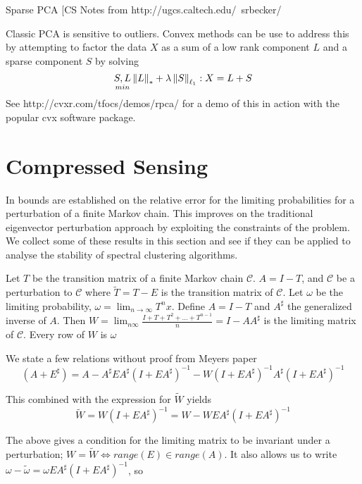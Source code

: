 Sparse PCA
[CS Notes from http://ugcs.caltech.edu/~srbecker/

Classic PCA is sensitive to outliers.  Convex methods can be use to address this by attempting to factor the data $X$ as a sum of a low rank component $L$ and a sparse component $S$ by solving
\begin{equation*}
\underset{min}{S,L} \left\Vert L\right\Vert_* + \lambda \left\Vert S\right\Vert_{\ell_1}  : X=L+S
\end{equation*}
See http://cvxr.com/tfocs/demos/rpca/ for a demo of this in action with the popular cvx software package.



\section{Compressed Sensing}
In \cite{meyer1980condition} bounds are established on the relative error for the limiting probabilities for a perturbation of a finite Markov chain.  This improves on the traditional eigenvector perturbation approach by exploiting the constraints of the problem.  We collect some of these results in this section and see if they can be applied to analyse the stability of spectral clustering algorithms.

Let $T$ be the transition matrix of a finite Markov chain $\mathcal{C}$. $A=I-T$, and $\mathcal{C}$ be a perturbation to $\mathcal{C}$ where $\tilde{T} =T-E$ is the transition matrix of  $\mathcal{C}$. Let $\omega$ be the limiting probability, $\omega = \lim_{n \to \infty} T^n x$. Define $A=I-T$ and $A^\sharp$ the generalized inverse of $A$. Then $W=\lim_{n  \infty} \frac{I+T+T^2 + \ldots + T^{n-1}}{n} = I-A A^\sharp$ is the limiting matrix of $\mathcal{C}$.  Every row of $W$ is $\omega$

We state a few relations without proof from Meyers paper
\begin{equation}
(A+E^\sharp)=A - A^\sharp E A^\sharp (I+ E A^\sharp)^{-1} - W(I+E A^\sharp)^{-1} A^\sharp (I+E A^\sharp)^{-1}
\end{equation}

This combined with the expression for $\tilde{W}$ yields
\begin{equation}
\tilde{W} = W(I+E A^\sharp)^{-1} = W - W E A^\sharp (I + E A^\sharp)^{-1}
\end{equation}

The above gives a condition for the limiting matrix to be invariant under a perturbation;  $W=\tilde{W} \iff range(E) \in range(A)$.  It also allows us to write $\omega - \tilde{\omega} = \omega E A^\sharp (I+ E A^\sharp)^{-1}$, so

